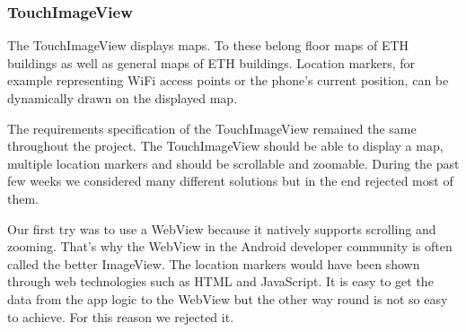 \subsubsection{TouchImageView}


The TouchImageView displays maps. To these belong floor maps of ETH buildings as well as general maps of ETH buildings. Location markers, for example representing WiFi access points or the phone's current position, can be dynamically drawn on the displayed map.

The requirements specification of the TouchImageView remained the same throughout the project. The TouchImageView should be able to display a map, multiple location markers and should be scrollable and zoomable. During the past few weeks we considered many different solutions but in the end rejected most of them.

Our first try was to use a WebView because it natively supports scrolling and zooming. That's why the WebView in the Android developer community is often called the better ImageView. The location markers would have been shown through web technologies such as HTML and JavaScript. It is easy to get the data from the app logic to the WebView but the other way round is not so easy to achieve. For this reason we rejected it. 


